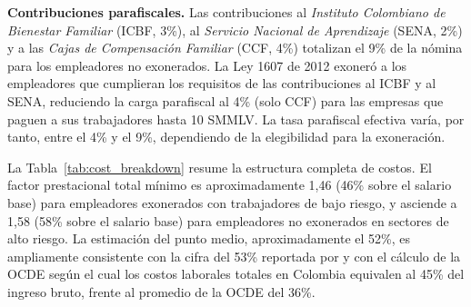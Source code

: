 \documentclass{article}
\begin{document}
\textbf{Contribuciones parafiscales.} Las contribuciones al \textit{Instituto Colombiano de Bienestar Familiar} (ICBF, 3\%), al \textit{Servicio Nacional de Aprendizaje} (SENA, 2\%) y a las \textit{Cajas de Compensaci\'on Familiar} (CCF, 4\%) totalizan el 9\% de la n\'omina para los empleadores no exonerados. La Ley 1607 de 2012 exoner\'o a los empleadores que cumplieran los requisitos de las contribuciones al ICBF y al SENA, reduciendo la carga parafiscal al 4\% (solo CCF) para las empresas que paguen a sus trabajadores hasta 10 SMMLV. La tasa parafiscal efectiva var\'ia, por tanto, entre el 4\% y el 9\%, dependiendo de la elegibilidad para la exoneraci\'on.

La Tabla~\ref{tab:cost_breakdown} resume la estructura completa de costos. El factor prestacional total m\'inimo es aproximadamente 1,46 (46\% sobre el salario base) para empleadores exonerados con trabajadores de bajo riesgo, y asciende a 1,58 (58\% sobre el salario base) para empleadores no exonerados en sectores de alto riesgo. La estimaci\'on del punto medio, aproximadamente el 52\%, es ampliamente consistente con la cifra del 53\% reportada por \cite{anif2018} y con el c\'alculo de la OCDE seg\'un el cual los costos laborales totales en Colombia equivalen al 45\% del ingreso bruto, frente al promedio de la OCDE del 36\%.
\end{document}
